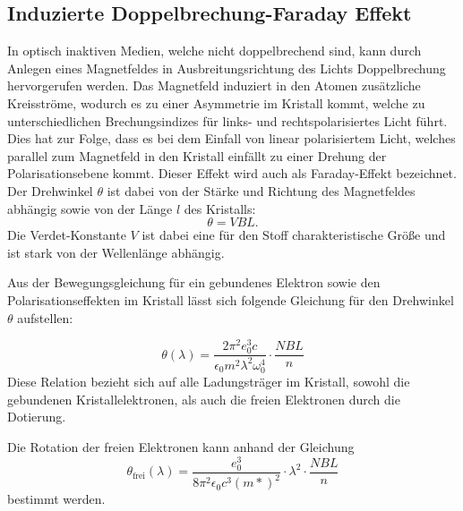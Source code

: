 \subsection{Induzierte Doppelbrechung-Faraday Effekt}
In optisch inaktiven Medien, welche nicht doppelbrechend sind, kann durch Anlegen eines Magnetfeldes in Ausbreitungsrichtung des Lichts
Doppelbrechung hervorgerufen werden. Das Magnetfeld induziert in den Atomen zusätzliche Kreisströme, wodurch es zu einer Asymmetrie im
Kristall kommt, welche zu unterschiedlichen Brechungsindizes für links- und rechtspolarisiertes Licht führt. Dies hat zur Folge, dass es
bei dem Einfall von linear polarisiertem Licht, welches parallel zum Magnetfeld in den Kristall einfällt zu einer Drehung der
Polarisationsebene kommt. Dieser Effekt wird auch als Faraday-Effekt bezeichnet.
Der Drehwinkel $\theta$ ist dabei von der Stärke und Richtung des Magnetfeldes abhängig sowie von der Länge $l$ des Kristalls:
\begin{equation}
  \theta=VBL.
\end{equation}
Die Verdet-Konstante $V$ ist dabei eine für den Stoff charakteristische Größe und ist stark von der Wellenlänge abhängig.

Aus der Bewegungsgleichung für ein gebundenes Elektron sowie den Polarisationseffekten im Kristall lässt sich folgende Gleichung
für den Drehwinkel $\theta$ aufstellen:

\begin{equation}
  \theta(\lambda)=\frac{2\pi^2e_0^3c}{\epsilon_0 m^2 \lambda^2 \omega_0^4}\cdot\frac{NBL}{n}
\end{equation}
Diese Relation bezieht sich auf alle Ladungsträger im Kristall, sowohl die gebundenen Kristallelektronen, als auch die
freien Elektronen durch die Dotierung.

Die Rotation der freien Elektronen kann anhand der Gleichung
\begin{equation}
  \theta_\text{frei}(\lambda)=\frac{e_0^3}{8\pi^2\epsilon_0c^3(m*)^2}\cdot\lambda^2\cdot\frac{NBL}{n}
\end{equation}
bestimmt werden.
